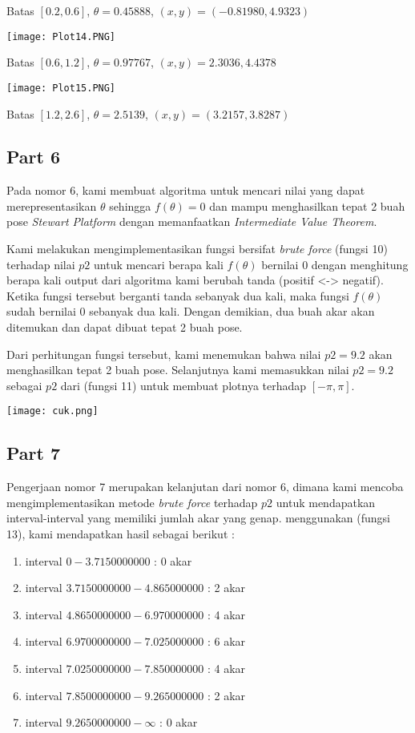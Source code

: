 \documentclass[11pt]{article}
\begin{document}
\begin{multicols}{2}
Batas $[0.2, 0.6]$, $\theta=0.45888$, $(x,y)=(-0.81980,4.9323)$

\texttt{[image: Plot14.PNG]}

Batas $[0.6, 1.2]$, $\theta=0.97767$, $(x,y)=2.3036, 4.4378$

\texttt{[image: Plot15.PNG]}

Batas $[1.2, 2.6]$, $\theta=2.5139$, 
$(x,y)=(3.2157,3.8287)$

\subsection{Part 6}
Pada nomor 6, kami membuat algoritma untuk mencari nilai yang dapat merepresentasikan $\theta$ sehingga $f(\theta) = 0$ dan mampu menghasilkan tepat 2 buah pose \textit{Stewart Platform} dengan memanfaatkan \textit{Intermediate Value Theorem}.

\medskip

Kami melakukan mengimplementasikan fungsi bersifat \textit{brute force} (fungsi 10) terhadap nilai $p2$ untuk mencari berapa kali $f(\theta)$ bernilai $0$ dengan menghitung berapa kali output dari algoritma kami berubah tanda (positif <-> negatif). Ketika fungsi tersebut berganti tanda sebanyak dua kali, maka fungsi $f(\theta)$ sudah bernilai $0$ sebanyak dua kali. Dengan demikian, dua buah akar akan ditemukan dan dapat dibuat tepat 2 buah pose.

\medskip

Dari perhitungan fungsi tersebut, kami menemukan bahwa nilai $p2 = 9.2$ akan menghasilkan tepat 2 buah pose. Selanjutnya kami memasukkan nilai $p2 = 9.2$ sebagai $p2$ dari (fungsi 11) untuk membuat plotnya terhadap $[-\pi, \pi]$.

\texttt{[image: cuk.png]}

\subsection{Part 7}
Pengerjaan nomor 7 merupakan kelanjutan dari nomor 6, dimana kami mencoba mengimplementasikan metode \textit{brute force} terhadap $p2$ untuk mendapatkan interval-interval yang memiliki jumlah akar yang genap. menggunakan (fungsi 13), kami mendapatkan hasil sebagai berikut : 

\begin{enumerate}
    \item interval $0 - 3.7150000000$ : 0 akar
    \item interval $3.7150000000 - 4.865000000$ : 2 akar
    \item interval $4.8650000000 - 6.970000000$ : 4 akar
    \item interval $6.9700000000 - 7.025000000$ : 6 akar
    \item interval $7.0250000000 - 7.850000000$ : 4 akar
    \item interval $7.8500000000 - 9.265000000$ : 2 akar
    \item interval $9.2650000000 - \infty$ : 0 akar
\end{enumerate}




\end{multicols}
\end{document}

